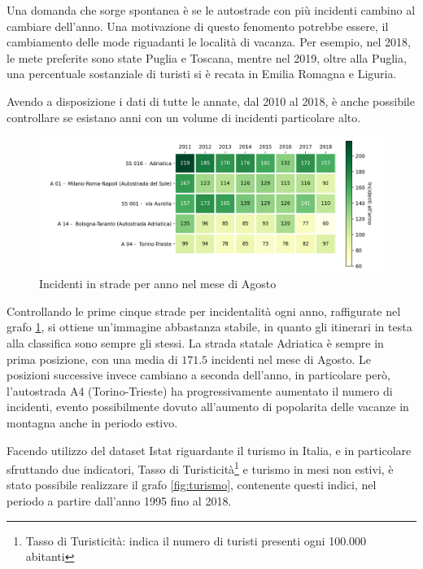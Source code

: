 \documentclass[a4paper,12pt]{report}
\begin{document}
Una domanda che sorge spontanea è se le autostrade con più incidenti 
cambino al cambiare dell'anno.
Una motivazione di questo fenomento potrebbe essere, il cambiamento 
delle mode riguadanti le località di vacanza.
Per esempio, nel 2018, le mete preferite sono state Puglia e 
Toscana\cite{INFOGRAFICA_ISTAT:1}, mentre nel 2019, oltre alla Puglia, 
una percentuale sostanziale di turisti si è recata in 
Emilia Romagna e Liguria\cite{REPORT_ISTAT_2019:1}.

Avendo a disposizione i dati di tutte le annate, dal 2010 al 2018, 
è anche possibile controllare se esistano anni con un volume di 
incidenti particolare alto.

\begin{figure}
    \includegraphics[width=\linewidth]{../src/incidenti/incidenti_aci/agosto/vacanze_autostrade.png}
    \caption{Incidenti in strade per anno nel mese di Agosto}
    \label{fig:autostrade-anno}
\end{figure}

Controllando le prime cinque strade per incidentalità ogni anno, 
raffigurate nel grafo \ref{fig:autostrade-anno}, si ottiene un'immagine 
abbastanza stabile, in quanto gli itinerari in testa alla classifica sono 
sempre gli stessi.
La strada statale Adriatica è sempre in prima posizione, con una media di $171.5$ 
incidenti nel mese di Agosto.
Le posizioni successive invece cambiano a seconda dell'anno, in particolare però, 
l'autostrada A4 (Torino-Trieste) ha progressivamente aumentato il numero di 
incidenti, evento possibilmente dovuto all'aumento di popolarita delle vacanze 
in montagna anche in periodo estivo.

Facendo utilizzo del dataset Istat riguardante il turismo in Italia, e in 
particolare sfruttando due indicatori, Tasso di 
Turisticità\footnote{Tasso di Turisticità: indica il numero di turisti 
presenti ogni 100.000 abitanti\cite{ONTIT:1}} 
e turismo in mesi non estivi, è stato possibile realizzare il grafo \ref{fig:turismo}, 
contenente questi indici, nel periodo a partire dall'anno 1995 fino al 2018.
\end{document}
